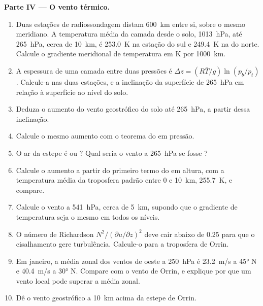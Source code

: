 \begin{problem}
\medskip\noindent\textbf{Parte IV --- O vento térmico.}
\begin{enumerate}[resume]
\item Duas estações de radiossondagem distam \qty{600}{km} entre si, sobre o mesmo
  meridiano. A temperatura média da camada desde o solo,
  \qty{1013}{hPa}, até \qty{265}{hPa}, cerca de \qty{10}{km}, é \qty{253.0}{K}
  na estação do sul e \qty{249.4}{K} na do norte. Calcule o
  gradiente meridional de temperatura em \unit{K} por \qty{1000}{km}.
\item A espessura de uma camada entre duas pressões é $\Delta z = (R\bar
  T/g)\ln(p_b/p_t)$. Calcule-a nas duas estações, e a inclinação da
  superfície de \qty{265}{hPa} em relação à superfície ao nível do solo.
\item Deduza o aumento do vento geostrófico do solo até
  \qty{265}{hPa}, a partir dessa inclinação.
\item Calcule o mesmo aumento com o teorema do  em pressão.
\item O ar da estepe é  ou ? Qual seria o vento
  a \qty{265}{hPa} se fosse ?
\item Calcule o aumento a partir do primeiro termo do  em
  altura, com a temperatura média da troposfera padrão entre 0
  e \qty{10}{km}, \qty{255.7}{K}, e compare.
\item Calcule o vento a \qty{541}{hPa}, cerca de \qty{5}{km}, supondo que o
  gradiente de temperatura seja o mesmo em todos os níveis.
\item O número de Richardson $N^2/(\partial u/\partial z)^2$ deve cair abaixo de
  0.25 para que o cisalhamento gere turbulência. Calcule-o para a troposfera de
  Orrin.
\item Em janeiro, a média zonal dos ventos de oeste a \qty{250}{hPa} é \qty{23.2}{m/s}
  a \ang{45} N e \qty{40.4}{m/s} a \ang{30} N. Compare com o vento de
  Orrin, e explique por que um vento local pode superar a média zonal.
\item Dê o vento geostrófico a \qty{10}{km} acima da estepe de Orrin.
\end{enumerate}
\end{problem}
